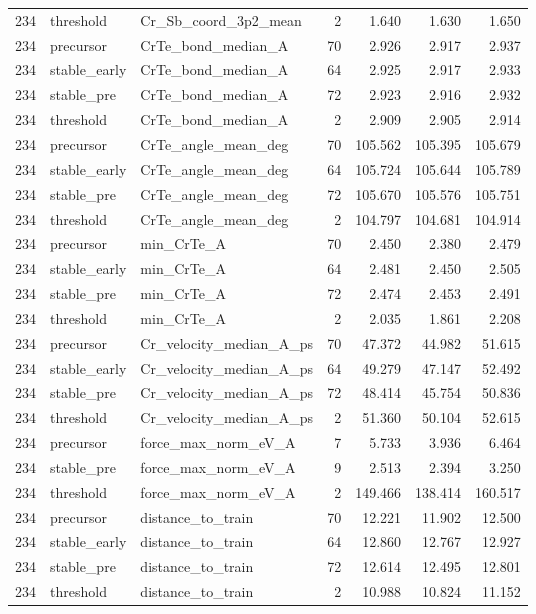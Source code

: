 \begin{tabular}{lllrrrr}
234 & threshold & Cr_Sb_coord_3p2_mean & 2 & 1.640 & 1.630 & 1.650 \\
234 & precursor & CrTe_bond_median_A & 70 & 2.926 & 2.917 & 2.937 \\
234 & stable_early & CrTe_bond_median_A & 64 & 2.925 & 2.917 & 2.933 \\
234 & stable_pre & CrTe_bond_median_A & 72 & 2.923 & 2.916 & 2.932 \\
234 & threshold & CrTe_bond_median_A & 2 & 2.909 & 2.905 & 2.914 \\
234 & precursor & CrTe_angle_mean_deg & 70 & 105.562 & 105.395 & 105.679 \\
234 & stable_early & CrTe_angle_mean_deg & 64 & 105.724 & 105.644 & 105.789 \\
234 & stable_pre & CrTe_angle_mean_deg & 72 & 105.670 & 105.576 & 105.751 \\
234 & threshold & CrTe_angle_mean_deg & 2 & 104.797 & 104.681 & 104.914 \\
234 & precursor & min_CrTe_A & 70 & 2.450 & 2.380 & 2.479 \\
234 & stable_early & min_CrTe_A & 64 & 2.481 & 2.450 & 2.505 \\
234 & stable_pre & min_CrTe_A & 72 & 2.474 & 2.453 & 2.491 \\
234 & threshold & min_CrTe_A & 2 & 2.035 & 1.861 & 2.208 \\
234 & precursor & Cr_velocity_median_A_ps & 70 & 47.372 & 44.982 & 51.615 \\
234 & stable_early & Cr_velocity_median_A_ps & 64 & 49.279 & 47.147 & 52.492 \\
234 & stable_pre & Cr_velocity_median_A_ps & 72 & 48.414 & 45.754 & 50.836 \\
234 & threshold & Cr_velocity_median_A_ps & 2 & 51.360 & 50.104 & 52.615 \\
234 & precursor & force_max_norm_eV_A & 7 & 5.733 & 3.936 & 6.464 \\
234 & stable_pre & force_max_norm_eV_A & 9 & 2.513 & 2.394 & 3.250 \\
234 & threshold & force_max_norm_eV_A & 2 & 149.466 & 138.414 & 160.517 \\
234 & precursor & distance_to_train & 70 & 12.221 & 11.902 & 12.500 \\
234 & stable_early & distance_to_train & 64 & 12.860 & 12.767 & 12.927 \\
234 & stable_pre & distance_to_train & 72 & 12.614 & 12.495 & 12.801 \\
234 & threshold & distance_to_train & 2 & 10.988 & 10.824 & 11.152 \\

\end{tabular}
